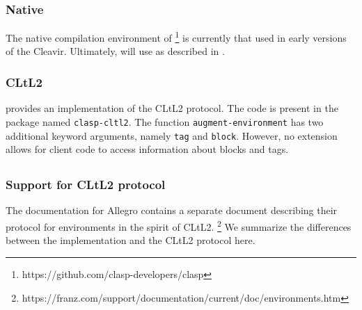\subsubsection{Native}

The native compilation environment of \clasp{}%
\footnote{https://github.com/clasp-developers/clasp}
is currently that used in early versions of the Cleavir.  Ultimately,
\clasp{} will use \trucler{} as described in .

\subsubsection{CLtL2}

\clasp{} provides an implementation of the CLtL2 protocol.
The code is present in the package named \texttt{clasp-cltl2}.  The
function \texttt{augment-environment} has two additional keyword
arguments, namely \texttt{tag} and \texttt{block}.  However, no
extension allows for client code to access information about blocks
and tags.

\subsection{\allegro{}}
\label{sec-previous-allegro}

\subsubsection{Support for CLtL2 protocol}

The documentation for Allegro \commonlisp{} contains a separate
document describing their protocol for environments in the spirit of
CLtL2.%
\footnote{https://franz.com/support/documentation/current/doc/environments.htm}
We summarize the differences between the \allegro{} implementation and
the CLtL2 protocol here.

